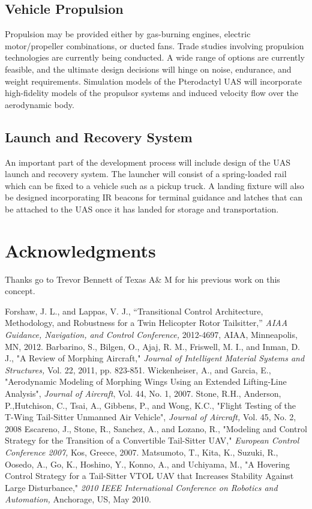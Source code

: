 \documentclass[]{aiaa-tc}%
\begin{document}
\subsection{Vehicle Propulsion}
Propulsion may be provided either by gas-burning engines, electric motor/propeller combinations, or ducted fans. Trade studies involving propulsion technologies are currently being conducted. A wide range of options are currently feasible, and the ultimate design decisions will hinge on noise, endurance, and weight requirements. Simulation models of the Pterodactyl UAS will incorporate high-fidelity models of the propulsor systems and induced velocity flow over the aerodynamic body.

\subsection{Launch and Recovery System}
An important part of the development process will include design of the UAS launch and recovery system. The launcher will consist of a spring-loaded rail which can be fixed to a vehicle such as a pickup truck. A landing fixture will also be designed incorporating IR beacons for terminal guidance and latches that can be attached to the UAS once it has landed for storage and transportation.


\section*{Acknowledgments}

Thanks go to Trevor Bennett of Texas A\& M for his previous work on this concept.

\begin{thebibliography}{9}%
Forshaw, J. L., and Lappas, V. J., “Transitional Control Architecture, Methodology, and Robustness for a Twin Helicopter 
Rotor Tailsitter,” \emph{AIAA Guidance, Navigation, and Control Conference,} 2012-4697, AIAA, Minneapolis, MN, 2012. 
 Barbarino, S., Bilgen, O., Ajaj, R. M., Friswell, M. I., and Inman, D. J., "A Review of Morphing Aircraft," \emph{Journal of Intelligent Material Systems and Structures,} Vol. 22, 2011, pp. 823-851.
Wickenheiser, A., and Garcia, E., "Aerodynamic Modeling of Morphing Wings Using an Extended Lifting-Line Analysis", \emph{Journal of Aircraft}, Vol. 44, No. 1, 2007.
 Stone, R.H., Anderson, P.,Hutchison, C., Tsai, A., Gibbens, P., and Wong, K.C., "Flight Testing of the T-Wing Tail-Sitter Unmanned Air Vehicle", \emph{Journal of Aircraft,} Vol. 45, No. 2, 2008
 Escareno, J., Stone, R., Sanchez, A., and Lozano, R., "Modeling and Control Strategy for the Transition of a Convertible Tail-Sitter UAV," \emph{European Control Conference 2007,} Kos, Greece, 2007.
Matsumoto, T., Kita, K., Suzuki, R., Oosedo, A., Go, K., Hoshino, Y., Konno, A., and Uchiyama, M., "A Hovering Control Strategy for a Tail-Sitter VTOL UAV that Increases Stability Against Large Disturbance," \emph{2010 IEEE International Conference on Robotics and Automation,} Anchorage, US, May 2010.

\end{thebibliography}
\end{document}
